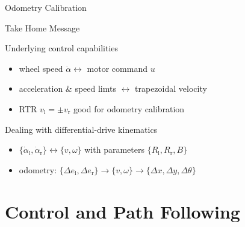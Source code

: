\documentclass{beamer}
\begin{document}
\begin{frame}{Odometry Calibration}
\end{frame}



\begin{frame}{Take Home Message}

  Underlying control capabilities
  \begin{itemize}
  \item
    wheel speed $\dot\alpha\leftrightarrow$ motor command $u$
  \item
    acceleration \& speed limts $\leftrightarrow$ trapezoidal velocity
  \item
    RTR $v_\text{l}=\pm v_\text{r}$ good for odometry calibration
  \end{itemize}
  
  \vfill
  
  Dealing with differential-drive kinematics
  \begin{itemize}
  \item
    $\{\dot\alpha_\text{l},\dot\alpha_\text{r}\} \leftrightarrow \{v,\omega\}$ with parameters $\{R_\text{l}, R_\text{r}, B\}$
  \item
    odometry: $\{\Delta e_\text{l}, \Delta e_\text{r}\} \rightarrow \{v,\omega\} \rightarrow \{\Delta x, \Delta y, \Delta \theta\}$
  \end{itemize}
  
\end{frame}


\part{Control and Path Following}

\begin{frame}
  \partpage
  \tableofcontents
\end{frame}
\end{document}
